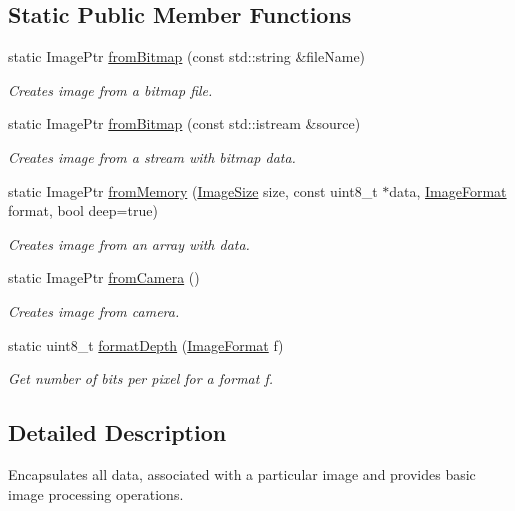 \subsection*{Static Public Member Functions}
\begin{DoxyCompactItemize}
\item 
static ImagePtr \hyperlink{classipl_1_1Image_a79eb7a364c397be0fa9f7d8d792004b7}{fromBitmap} (const std::string \&fileName)
\begin{DoxyCompactList}\small\item\em Creates image from a bitmap file. \end{DoxyCompactList}\item 
static ImagePtr \hyperlink{classipl_1_1Image_a149ac729fa75f1b9b752ed2dcf35cbdf}{fromBitmap} (const std::istream \&source)
\begin{DoxyCompactList}\small\item\em Creates image from a stream with bitmap data. \end{DoxyCompactList}\item 
static ImagePtr \hyperlink{classipl_1_1Image_a8b45b7ea9d7e7164677f57f5cb743812}{fromMemory} (\hyperlink{structipl_1_1ImageSize}{ImageSize} size, const uint8\_\-t $\ast$data, \hyperlink{namespaceipl_ab3ec5a63ba3d76c0f5e35b7c8595ef32}{ImageFormat} format, bool deep=true)
\begin{DoxyCompactList}\small\item\em Creates image from an array with data. \end{DoxyCompactList}\item 
static ImagePtr \hyperlink{classipl_1_1Image_abafd7caada828ae76251efa727729e2a}{fromCamera} ()
\begin{DoxyCompactList}\small\item\em Creates image from camera. \end{DoxyCompactList}\item 
static uint8\_\-t \hyperlink{classipl_1_1Image_adbeb39b88deeee6e888d7a5c63a1a1b5}{formatDepth} (\hyperlink{namespaceipl_ab3ec5a63ba3d76c0f5e35b7c8595ef32}{ImageFormat} f)
\begin{DoxyCompactList}\small\item\em Get number of bits per pixel for a format f. \end{DoxyCompactList}\end{DoxyCompactItemize}


\subsection{Detailed Description}
Encapsulates all data, associated with a particular image and provides basic image processing operations. 

